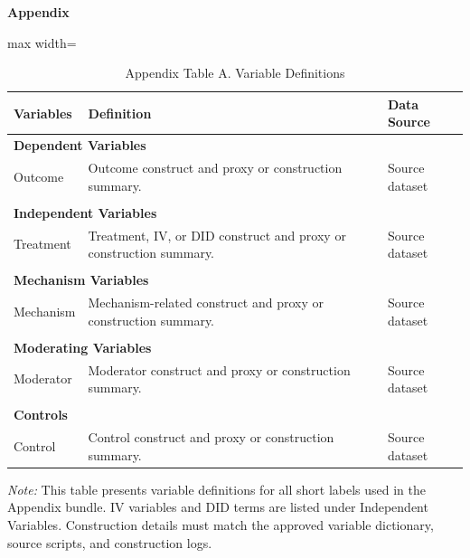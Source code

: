 \documentclass[UTF8]{ctexart}
\begin{document}
\appendix
\begin{center}
{\Large \textbf{Appendix}}
\end{center}
\vspace{1em}

\begin{table}[!htbp]
\centering
\caption{Appendix Table A. Variable Definitions}
\begin{threeparttable}
\small
\begin{adjustbox}{max width=\textwidth}
\begin{tabular}{p{}p{}p{}}
\toprule
Variables & Definition & Data Source \\
\midrule
\multicolumn{3}{l}{\textbf{Dependent Variables}} \\
Outcome & Outcome construct and proxy or construction summary. & Source dataset \\
\\
\multicolumn{3}{l}{\textbf{Independent Variables}} \\
Treatment & Treatment, IV, or DID construct and proxy or construction summary. & Source dataset \\
\\
\multicolumn{3}{l}{\textbf{Mechanism Variables}} \\
Mechanism & Mechanism-related construct and proxy or construction summary. & Source dataset \\
\\
\multicolumn{3}{l}{\textbf{Moderating Variables}} \\
Moderator & Moderator construct and proxy or construction summary. & Source dataset \\
\\
\multicolumn{3}{l}{\textbf{Controls}} \\
Control & Control construct and proxy or construction summary. & Source dataset \\
\bottomrule
\end{tabular}
\end{adjustbox}
\begin{tablenotes}
\footnotesize
\item \textit{Note:} This table presents variable definitions for all short labels used in the Appendix bundle. IV variables and DID terms are listed under Independent Variables. Construction details must match the approved variable dictionary, source scripts, and construction logs.
\end{tablenotes}
\end{threeparttable}
\end{table}
\end{document}
